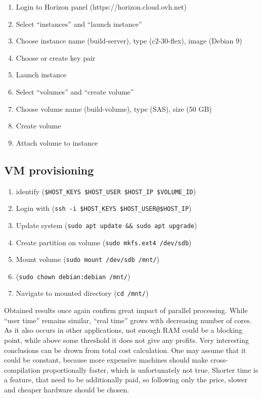 \documentclass[printmode]{mgr}
\begin{document}
\begin{enumerate}
  \item Login to Horizon panel (https://horizon.cloud.ovh.net)
  \item Select ``instances'' and ``launch instance''
  \item Choose instance name (build-server), type (c2-30-flex), image (Debian 9)
  \item Choose or create key pair
  \item Launch instance
  \item Select ``volumes'' and ``create volume'' %
  \item Choose volume name (build-volume), type (SAS), size (50 GB)
  \item Create volume
  \item Attach volume to instance
\end{enumerate}

\subsection*{VM provisioning}

\begin{enumerate}
  \item identify (\verb|$HOST_KEYS $HOST_USER $HOST_IP $VOLUME_ID|)
  \item Login with (\verb|ssh -i $HOST_KEYS $HOST_USER@$HOST_IP|)
  \item Update system (\verb|sudo apt update && sudo apt upgrade|)
  \item Create partition on volume (\verb|sudo mkfs.ext4 /dev/sdb|)
  \item Mount volume (\verb|sudo mount /dev/sdb /mnt/|)
  \item (\verb|sudo chown debian:debian /mnt/|)
  \item Navigate to mounted directory (\verb|cd /mnt/|)
\end{enumerate}

Obtained results once again confirm great impact of parallel processing.
While ``user time'' remains similar, ``real time'' grows with decreasing number of cores.
As it also occurs in other applications, not enough RAM could be a blocking point, while above some threshold it does not give any profits.
Very interesting conclusions can be drown from total cost calculation.
One may assume that it could be constant, because more expensive machines should make cross-compilation proportionally faster, which is unfortunately not true.
Shorter time is a feature, that need to be additionally paid, so following only the price, slower and cheaper hardware should be chosen.
\end{document}
